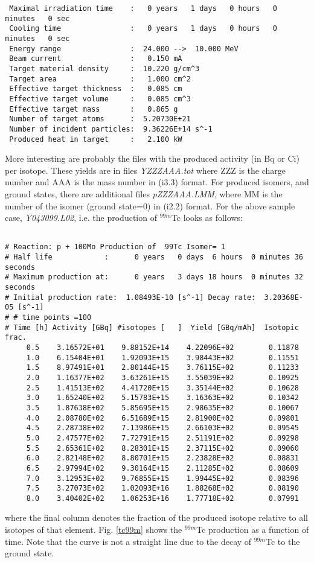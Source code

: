 \begin{samplecase}
{\begin{verbatim}
 Maximal irradiation time    :   0 years   1 days   0 hours   0 minutes   0 sec
 Cooling time                :   0 years   1 days   0 hours   0 minutes   0 sec
 Energy range                :  24.000 -->  10.000 MeV
 Beam current                :   0.150 mA
 Target material density     :  10.220 g/cm^3
 Target area                 :   1.000 cm^2
 Effective target thickness  :   0.085 cm
 Effective target volume     :   0.085 cm^3
 Effective target mass       :   0.865 g
 Number of target atoms      :  5.20730E+21
 Number of incident particles:  9.36226E+14 s^-1
 Produced heat in target     :   2.100 kW
\end{verbatim} } \renewcommand{\baselinestretch}{1.07}\small\normalsize
\noindent
More interesting are probably the files with the produced activity (in Bq or Ci) per
isotope. These yields are in files
{\em YZZZAAA.tot} where ZZZ is the charge number and AAA is the mass number in
(i3.3) format. For produced isomers, and ground states, 
there are additional files {\em pZZZAAA.LMM}, where MM is the number
of the isomer (ground state=0) in (i2.2) format.
For the above sample case, {\it Y043099.L02}, i.e. the production of ${}^{99m}$Tc
looks as follows:
{\small \begin{verbatim}

# Reaction: p + 100Mo Production of  99Tc Isomer= 1
# Half life            :      0 years   0 days  6 hours  0 minutes 36 seconds
# Maximum production at:      0 years   3 days 18 hours  0 minutes 32 seconds
# Initial production rate:  1.08493E-10 [s^-1] Decay rate:  3.20368E-05 [s^-1]
# # time points =100
# Time [h] Activity [GBq] #isotopes [   ]  Yield [GBq/mAh]  Isotopic frac.
     0.5    3.16572E+01    9.88152E+14    4.22096E+02        0.11878
     1.0    6.15404E+01    1.92093E+15    3.98443E+02        0.11551
     1.5    8.97491E+01    2.80144E+15    3.76115E+02        0.11233
     2.0    1.16377E+02    3.63261E+15    3.55039E+02        0.10925
     2.5    1.41513E+02    4.41720E+15    3.35144E+02        0.10628
     3.0    1.65240E+02    5.15783E+15    3.16363E+02        0.10342
     3.5    1.87638E+02    5.85695E+15    2.98635E+02        0.10067
     4.0    2.08780E+02    6.51689E+15    2.81900E+02        0.09801
     4.5    2.28738E+02    7.13986E+15    2.66103E+02        0.09545
     5.0    2.47577E+02    7.72791E+15    2.51191E+02        0.09298
     5.5    2.65361E+02    8.28301E+15    2.37115E+02        0.09060
     6.0    2.82148E+02    8.80701E+15    2.23828E+02        0.08831
     6.5    2.97994E+02    9.30164E+15    2.11285E+02        0.08609
     7.0    3.12953E+02    9.76855E+15    1.99445E+02        0.08396
     7.5    3.27073E+02    1.02093E+16    1.88268E+02        0.08190
     8.0    3.40402E+02    1.06253E+16    1.77718E+02        0.07991
\end{verbatim} } \renewcommand{\baselinestretch}{1.07}\small\normalsize
\noindent
where the final column denotes the fraction of the produced isotope relative to all 
isotopes of that element. Fig. \ref{tc99m} shows the $^{99m}$Tc production as a function of time.
Note that the curve is not  a straight line due to the decay of $^{99m}$Tc to 
the ground state.
\end{samplecase}
